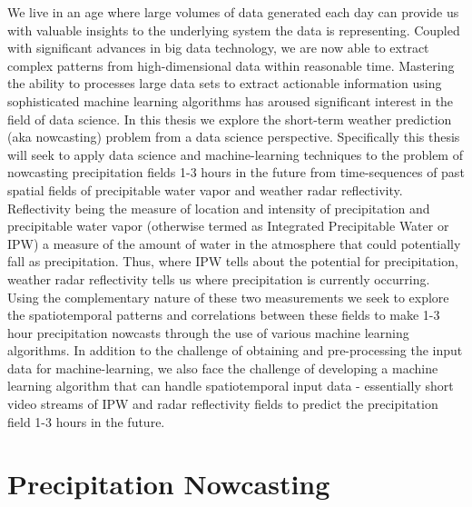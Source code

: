 \documentclass[proposal]{umassthesis}
\begin{document}
We live in an age where large volumes of data generated each day can provide us with valuable insights to the underlying system the data is representing. Coupled with significant advances in big data technology, we are now able to extract complex patterns from high-dimensional data within reasonable time. Mastering the ability to processes large data sets to extract actionable information using sophisticated machine learning algorithms has aroused significant interest in the field of data science. In this thesis we explore the short-term weather prediction (aka nowcasting) problem from a data science perspective. Specifically this thesis will seek to apply data science and machine-learning techniques to the problem of nowcasting precipitation fields 1-3 hours in the future from time-sequences of past spatial fields of precipitable water vapor and weather radar reflectivity. Reflectivity being the measure of location and intensity of precipitation and precipitable water vapor (otherwise termed as Integrated Precipitable Water or IPW) a measure of the amount of water in the atmosphere that could potentially fall as precipitation. Thus, where IPW tells about the potential for precipitation, weather radar reflectivity tells us where precipitation is currently occurring. Using the complementary nature of these two measurements we seek to explore the spatiotemporal patterns and correlations between these fields to make 1-3 hour precipitation nowcasts through the use of various machine learning algorithms. In addition to the challenge of obtaining and pre-processing the input data for machine-learning, we also face the challenge of developing a machine learning algorithm that can handle spatiotemporal input data - essentially short video streams of IPW and radar reflectivity fields to predict the precipitation field 1-3 hours in the future.
\section{Precipitation Nowcasting}
\end{document}
